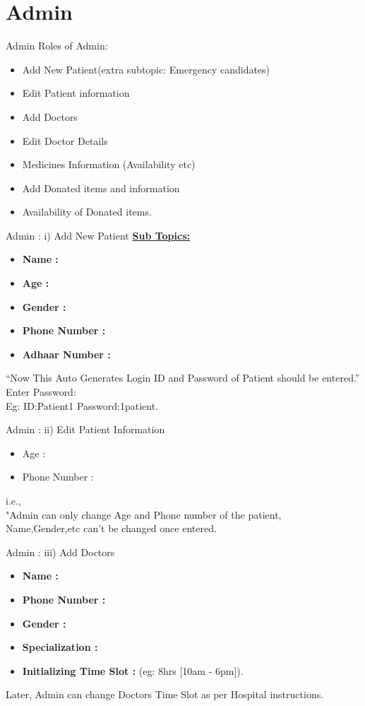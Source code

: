\documentclass{beamer}
\begin{document}
\section{Admin}
\begin{frame}{Admin}
Roles of Admin:
\begin{itemize}
    \item Add New Patient(extra subtopic: Emergency candidates) 
    \item Edit Patient information
    \item Add Doctors
    \item Edit Doctor Details
    \item Medicines Information (Availability etc)
    \item Add Donated items and information
    \item Availability of Donated items.
\end{itemize}

\end{frame}
%
\begin{frame}{Admin : i) Add New Patient}
\underline{\textbf{Sub Topics:}}
\begin{itemize}
\item \textbf{Name :}
\item \textbf{Age :}
\item \textbf{Gender :}
\item \textbf{Phone Number :}
\item \textbf{Adhaar Number :}
\end{itemize}
“Now This Auto Generates Login ID and Password of Patient should be entered.”\\
Enter Password:\\
Eg: ID:Patient1 Password:1patient.
\end{frame}
%
\begin{frame}{Admin : ii) Edit Patient Information}
\begin{itemize}
\item Age :
\item Phone Number :
\end{itemize}
i.e.,\\[12pt]
"Admin can only change Age and Phone number of the patient,\\
Name,Gender,etc can't be changed once entered.
\end{frame}
%
\begin{frame}{Admin : iii) Add Doctors}
\begin{itemize}
\item \textbf{Name :}
\item \textbf{Phone Number :}
\item \textbf{Gender :}
\item \textbf{Specialization :}
\item \textbf{Initializing Time Slot :} (eg: 8hrs [10am - 6pm]).
\end{itemize}
Later, Admin can change Doctors Time Slot as per Hospital instructions.
\end{frame}
\end{document}
